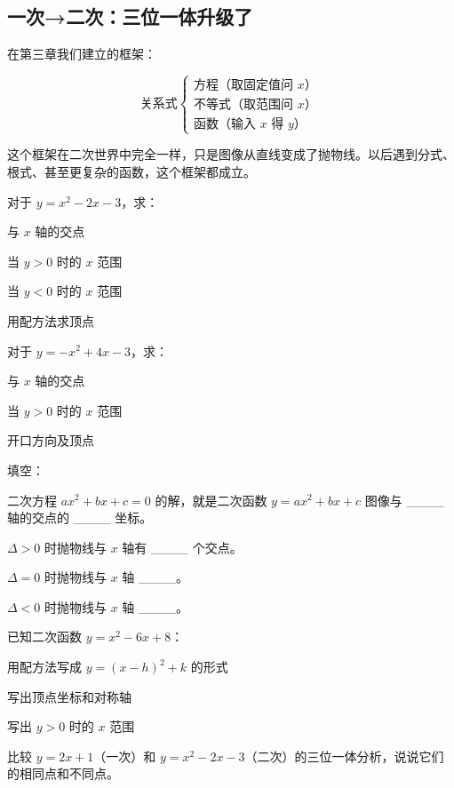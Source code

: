 \subsection*{一次→二次：三位一体升级了}

在第三章我们建立的框架：

\[
\text{关系式} \begin{cases}
\text{方程（取固定值问 $x$）}\\
\text{不等式（取范围问 $x$）}\\
\text{函数（输入 $x$ 得 $y$）}
\end{cases}
\]

这个框架在二次世界中完全一样，只是图像从直线变成了抛物线。以后遇到分式、根式、甚至更复杂的函数，这个框架都成立。

\begin{exercise}
\item 对于 $y = x^2 - 2x - 3$，求：
  \begin{subexercise}
    \item 与 $x$ 轴的交点
    \item 当 $y>0$ 时的 $x$ 范围
    \item 当 $y<0$ 时的 $x$ 范围
    \item 用配方法求顶点
  \end{subexercise}

\item 对于 $y = -x^2 + 4x - 3$，求：
  \begin{subexercise}
    \item 与 $x$ 轴的交点
    \item 当 $y>0$ 时的 $x$ 范围
    \item 开口方向及顶点
  \end{subexercise}

\item 填空：
  \begin{subexercise}
    \item 二次方程 $ax^2+bx+c=0$ 的解，就是二次函数 $y=ax^2+bx+c$ 图像与 \_\_\_\_ 轴的交点的 \_\_\_\_ 坐标。
    \item $\Delta>0$ 时抛物线与 $x$ 轴有 \_\_\_\_ 个交点。
    \item $\Delta=0$ 时抛物线与 $x$ 轴 \_\_\_\_。
    \item $\Delta<0$ 时抛物线与 $x$ 轴 \_\_\_\_。
  \end{subexercise}

\item 已知二次函数 $y = x^2 - 6x + 8$：
  \begin{subexercise}
    \item 用配方法写成 $y=(x-h)^2+k$ 的形式
    \item 写出顶点坐标和对称轴
    \item 写出 $y>0$ 时的 $x$ 范围
  \end{subexercise}

\item 比较 $y=2x+1$（一次）和 $y=x^2-2x-3$（二次）的三位一体分析，说说它们的相同点和不同点。
\end{exercise}

